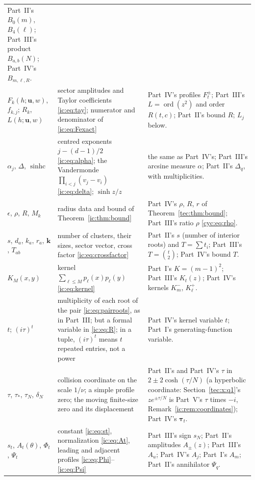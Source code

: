 \documentclass[11pt,a4paper]{article}
\numberwithin{equation}{section}
\theoremstyle{definition}
\theoremstyle{remark}
\newcommand{\bk}{\boldsymbol{k}}
\newcommand{\ord}{\operatorname{ord}}
\newcommand{\Del}{\Delta}
\newcommand{\bu}{\boldsymbol u}
\newcommand{\sinhc}{\operatorname{sinhc}}
\begin{document}
\begin{longtable}{@{}>{\raggedright}p{}>{\raggedright}p{}>{\raggedright\arraybackslash}p{}@{}}
   Part~II's $B_0(m)$, $B_4(\ell)$; Part~III's product $B_{a,b}(N)$;
   Part~IV's $B_{m,\ell,R}$.\\
$F_k(h;\bu,w)$, $f_{k,j}$; $R_k$, $L(h;\bu,w)$
 & sector amplitudes and Taylor coefficients \eqref{ic:eq:tay}; numerator
   and denominator of \eqref{ic:eq:Fexact}
 & Part~IV's profiles $F_t^\pm$; Part~III's $L=\ord(z^2)$ and order
   $R(t,c)$; Part~II's bound $R$; $L_j$ below.\\
$\alpha_j$, $\Del$, $\sinhc$
 & centred exponents $j-(d-1)/2$ \eqref{ic:eq:alpha}; the Vandermonde
   $\prod_{i<j}(v_j-v_i)$ \eqref{ic:eq:delta}; $\sinh z/z$
 & the same as Part~IV's; Part~III's arcsine measure $\alpha$; Part~II's
   $\Delta_q$, with multiplicities.\\
$\epsilon$, $\rho$, $R$, $M_k$
 & radius data and bound of Theorem~\ref{ic:thm:bound}
 & Part~IV's $\rho$, $R$, $r$ of Theorem~\ref{tec:thm:bound}; Part~III's
   ratio $\rho$ \eqref{cyc:eq:rho}.\\
$s$, $d_a$, $k_a$, $r_a$, $\bk$, $T_{ab}$
 & number of clusters, their sizes, sector vector, cross factor
   \eqref{ic:eq:crossfactor}
 & Part~II's $s$ (number of interior roots) and $T=\sum t_i$; Part~III's
   $T=\binom t2$; Part~IV's bound $T$.\\
$K_M(x,y)$
 & kernel $\sum_{\ell\le M}p_\ell(x)p_\ell(y)$ \eqref{ic:eq:kernel}
 & Part~I's $K=(m-1)^2$; Part~III's $K_t(z)$; Part~IV's kernels $K_m^-$,
   $K_\ell^+$.\\
$t$; $(i\tau)^t$
 & multiplicity of each root of the pair \eqref{ic:eq:pairroots}, as in
   Part~III; but a formal variable in \eqref{ic:eq:R}; in a tuple,
   $(i\tau)^t$ means $t$ repeated entries, not a power
 & Part~IV's kernel variable $t$; Part~I's generating-function
   variable.\\
$\tau$, $\tau_*$, $\tau_N$, $\delta_N$
 & collision coordinate on the scale $1/\nu$; a simple profile zero; the
   moving finite-size zero and its displacement
 & Part~II's and Part~IV's $\tau$ in $2\pm2\cosh(\tau/N)$ (a hyperbolic
   coordinate: Section~\ref{tec:x:q1}'s $ze^{\pm\tau/N}$ is Part~V's
   $\tau$ times $-i$, Remark~\ref{ic:rem:coordinates}); Part~IV's
   $\boldsymbol\tau_t$.\\
$s_t$, $A_t(\theta)$, $\Phi_t$, $\Psi_t$
 & constant \eqref{ic:eq:st}, normalization \eqref{ic:eq:At}, leading and
   adjacent profiles \eqref{ic:eq:Phi}--\eqref{ic:eq:Psi}
 & Part~III's sign $s_N$; Part~II's amplitudes $A_\pm(z)$; Part~III's
   $A_u$; Part~IV's $A_j$; Part~I's $A_m$; Part~II's annihilator
   $\Psi_q$.\\

\end{longtable}
\end{document}
